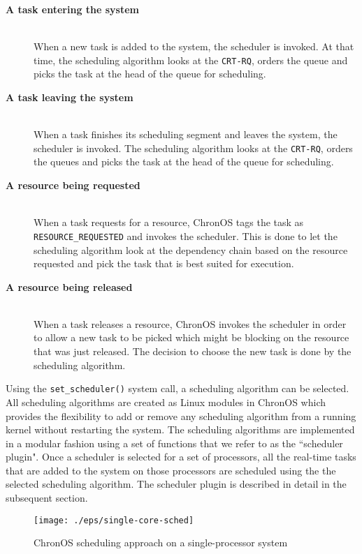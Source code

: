 \documentclass[12pt,dvips]{report}
\begin{document}
\begin{description}
	\item[\textbf{A task entering the system}] \hfill \\
		When a new task is added to the system, the scheduler is invoked. At that time, the scheduling
		algorithm looks at the \texttt{CRT-RQ}, orders the queue and picks the task at the head of the queue
		for scheduling.
		
	\item[\textbf{A task leaving the system}] \hfill \\
		When a task finishes its scheduling segment and leaves the system, the scheduler is invoked. The
		scheduling algorithm looks at the \texttt{CRT-RQ}, orders the queues and picks the task at the head of
		the queue for scheduling.
		
	\item[\textbf{A resource being requested}] \hfill \\
		When a task requests for a resource, ChronOS tags the task as \texttt{RESOURCE\_REQUESTED} and invokes
		the scheduler. This is done to let the scheduling algorithm look at the dependency chain
		based on the resource requested and pick the task that is best suited for execution. 
	
	\item[\textbf{A resource being released}] \hfill \\
		When a task releases a resource, ChronOS invokes the scheduler in order to allow a new task to be picked
		which might be blocking on the resource that was just released. The decision to choose the new task
		is done by the scheduling algorithm.
\end{description}

Using the \texttt{set\_scheduler()} system call, a scheduling algorithm can be selected. All scheduling algorithms are created as Linux modules in ChronOS which provides the flexibility to add or remove any scheduling algorithm from a running kernel without restarting the system. The scheduling algorithms are implemented in a modular fashion using a set of functions that we refer to as the ``scheduler plugin". Once a scheduler is selected for a set of processors, all the real-time tasks that are added to the system on those processors are scheduled using the the selected scheduling algorithm. The scheduler plugin is described in detail in the subsequent section.

\begin{figure} [htbp]
  \centering
  \texttt{[image: ./eps/single-core-sched]}
  \caption{ChronOS scheduling approach on a single-processor system}
  \label{fig:single-core-sched}
\end{figure}
\end{document}
